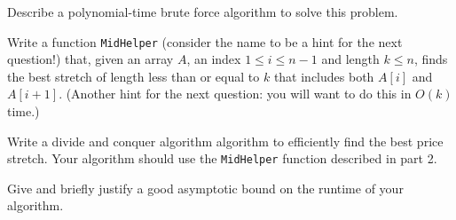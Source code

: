 \documentclass[11pt,fleqn]{exam}
\newif\ifsolutions\solutionsfalse
\begin{document}
 \begin{questions}
    \question[3] Describe a polynomial-time brute force algorithm to solve this problem.

    \ifsolutions\fi 

    \question[3] Write a function \texttt{MidHelper} (consider the name to be a hint for the next question!) that, given an array $A$, an index $1 \le i \le n-1$ and length $k \le n$, finds the best stretch of length less than or equal to $k$ that includes both $A[i]$ and $A[i+1]$. (Another hint for the next question: you will want to do this in $O(k)$ time.)

    \ifsolutions\fi

     \question[5] Write a divide and conquer algorithm algorithm to efficiently find the best price stretch. Your algorithm should use the \texttt{MidHelper} function described in part 2.

     \ifsolutions\fi 

     \question[2] Give and briefly justify a good asymptotic bound on the runtime of your algorithm.

     \ifsolutions\fi 
     
 \end{questions}
\end{document}
